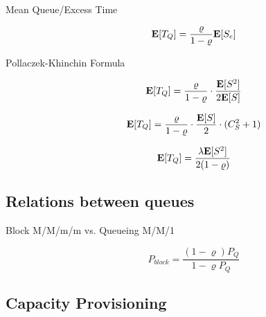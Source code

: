 \begin{description}
	
	\item [Mean Queue/Excess Time]
		\begin{equation}
		\mathbf{E}[T_{Q}]=\frac{\varrho}{1-\varrho}\mathbf{E}[S_{e}]
		\end{equation}
	
	\item [Pollaczek-Khinchin Formula]
		\begin{equation}
		\mathbf{E}[T_{Q}]=\frac{\varrho}{1-\varrho}\cdot\frac{\mathbf{E}[S^{2}]}{2\mathbf{E}[S]}
		\end{equation}
		
		\begin{equation}
		\mathbf{E}[T_{Q}]=\frac{\varrho}{1-\varrho}\cdot\frac{\mathbf{E}[S]}{2}\cdot(C_{S}^{2}+1)
		\end{equation}
		
		\begin{equation}
		\mathbf{E}[T_{Q}]=\frac{\lambda\mathbf{E}[S^{2}]}{2(1-\varrho)}
		\end{equation}
	
\end{description}




\subsection{Relations between queues}

\begin{description}
	
	\item [Block M/M/m/m vs. Queueing M/M/1]
		\begin{equation}
		P_{block} = \frac{(1-\varrho)P_{Q}}{1-\varrho P_{Q}}
		\end{equation}
	
	
\end{description}




\subsection{Capacity Provisioning}

